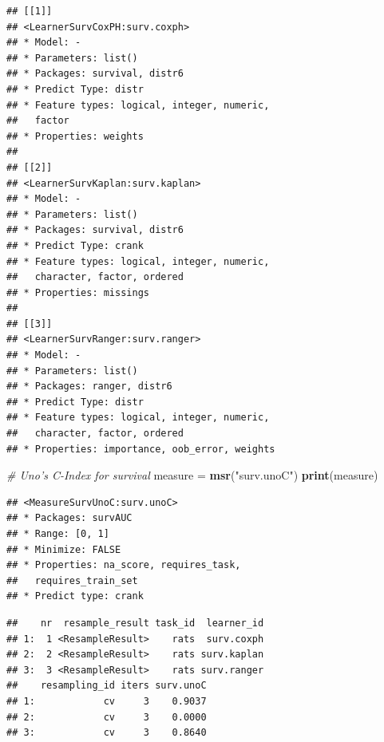 \documentclass[]{article}
\newenvironment{Shaded}{\begin{snugshade}}{\end{snugshade}}
\newcommand{\CommentTok}[1]{\textcolor[rgb]{0.56,0.35,0.01}{\textit{#1}}}
\newcommand{\DataTypeTok}[1]{\textcolor[rgb]{0.13,0.29,0.53}{#1}}
\newcommand{\DecValTok}[1]{\textcolor[rgb]{0.00,0.00,0.81}{#1}}
\newcommand{\KeywordTok}[1]{\textcolor[rgb]{0.13,0.29,0.53}{\textbf{#1}}}
\newcommand{\NormalTok}[1]{#1}
\newcommand{\OperatorTok}[1]{\textcolor[rgb]{0.81,0.36,0.00}{\textbf{#1}}}
\newcommand{\StringTok}[1]{\textcolor[rgb]{0.31,0.60,0.02}{#1}}
\renewenvironment{Shaded} {\begin{snugshade}\small} {\end{snugshade}}
\begin{document}
\begin{verbatim}
## [[1]]
## <LearnerSurvCoxPH:surv.coxph>
## * Model: -
## * Parameters: list()
## * Packages: survival, distr6
## * Predict Type: distr
## * Feature types: logical, integer, numeric,
##   factor
## * Properties: weights
## 
## [[2]]
## <LearnerSurvKaplan:surv.kaplan>
## * Model: -
## * Parameters: list()
## * Packages: survival, distr6
## * Predict Type: crank
## * Feature types: logical, integer, numeric,
##   character, factor, ordered
## * Properties: missings
## 
## [[3]]
## <LearnerSurvRanger:surv.ranger>
## * Model: -
## * Parameters: list()
## * Packages: ranger, distr6
## * Predict Type: distr
## * Feature types: logical, integer, numeric,
##   character, factor, ordered
## * Properties: importance, oob_error, weights
\end{verbatim}

\begin{Shaded}
\begin{Highlighting}[]
\CommentTok{# Uno's C-Index for survival}
\NormalTok{measure =}\StringTok{ }\KeywordTok{msr}\NormalTok{(}\StringTok{"surv.unoC"}\NormalTok{)}
\KeywordTok{print}\NormalTok{(measure)}
\end{Highlighting}
\end{Shaded}

\begin{verbatim}
## <MeasureSurvUnoC:surv.unoC>
## * Packages: survAUC
## * Range: [0, 1]
## * Minimize: FALSE
## * Properties: na_score, requires_task,
##   requires_train_set
## * Predict type: crank
\end{verbatim}

\begin{Shaded}
\end{Shaded}

\begin{verbatim}
##    nr  resample_result task_id  learner_id
## 1:  1 <ResampleResult>    rats  surv.coxph
## 2:  2 <ResampleResult>    rats surv.kaplan
## 3:  3 <ResampleResult>    rats surv.ranger
##    resampling_id iters surv.unoC
## 1:            cv     3    0.9037
## 2:            cv     3    0.0000
## 3:            cv     3    0.8640
\end{verbatim}
\end{document}

